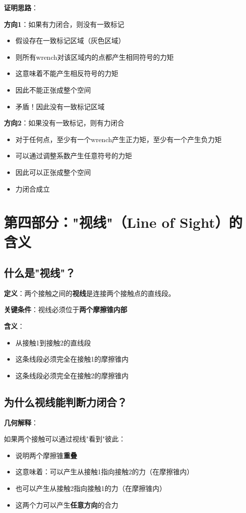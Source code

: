 \documentclass[12pt,a4paper]{article}
\begin{document}
\textbf{证明思路}：

\textbf{方向1}：如果有力闭合，则没有一致标记
\begin{itemize}
\item 假设存在一致标记区域（灰色区域）
\item 则所有wrench对该区域内的点都产生相同符号的力矩
\item 这意味着不能产生相反符号的力矩
\item 因此不能正张成整个空间
\item 矛盾！因此没有一致标记区域
\end{itemize}

\textbf{方向2}：如果没有一致标记，则有力闭合
\begin{itemize}
\item 对于任何点，至少有一个wrench产生正力矩，至少有一个产生负力矩
\item 可以通过调整系数产生任意符号的力矩
\item 因此可以正张成整个空间
\item 力闭合成立
\end{itemize}

\section{第四部分："视线"（Line of Sight）的含义}

\subsection{什么是"视线"？}

\textbf{定义}：两个接触之间的\textbf{视线}是连接两个接触点的直线段。

\textbf{关键条件}：视线必须位于\textbf{两个摩擦锥内部}

\textbf{含义}：
\begin{itemize}
\item 从接触1到接触2的直线段
\item 这条线段必须完全在接触1的摩擦锥内
\item 这条线段必须完全在接触2的摩擦锥内
\end{itemize}

\subsection{为什么视线能判断力闭合？}

\textbf{几何解释}：

如果两个接触可以通过视线"看到"彼此：
\begin{itemize}
\item 说明两个摩擦锥\textbf{重叠}
\item 这意味着：可以产生从接触1指向接触2的力（在摩擦锥内）
\item 也可以产生从接触2指向接触1的力（在摩擦锥内）
\item 这两个力可以产生\textbf{任意方向}的合力
\end{itemize}
\end{document}
